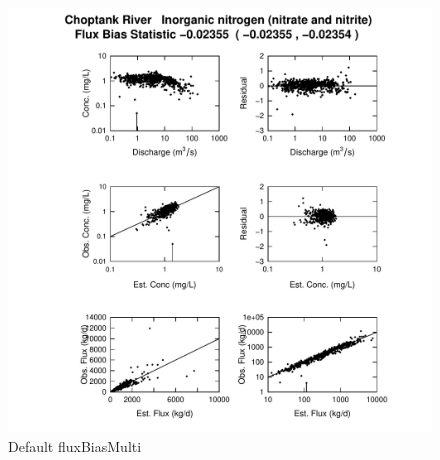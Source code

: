 \documentclass[a4paper,11pt]{article}\usepackage{graphicx, color}
\newenvironment{knitrout}{}{} %
\begin{document}
\begin{knitrout}
\color{fgcolor}\begin{figure}[]

\includegraphics[width=1\linewidth,height=1\linewidth]{figure/fluxBiasMulti} \caption[Default fluxBiasMulti]{Default fluxBiasMulti\label{fig:fluxBiasMulti}}
\end{figure}


\end{knitrout}
\end{document}
